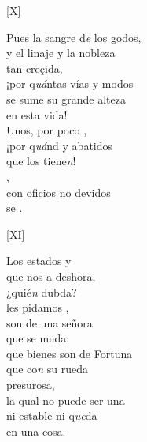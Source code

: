 \documentclass[11pt,a4paper,twoside]{article}
\begin{document}
{\begin{center}
	[X]
\end{center}
\pstart
Pues la sangre d\textit{e} los godos,\\
y el linaje y la nobleza\\
tan creçida,\\
¡por q\textit{uá}ntas vías y modos\\
se sume su grande alteza\\
en esta vida!\\
Unos, por poco ,\\
¡por q\textit{uá}nd  y abatidos\\
que los tiene\textit{n}!\\
,\\
con oficios no devidos\\
se .
\pend

\begin{center}
	[XI]
\end{center}
\pstart
Los estados y \\
que nos  a deshora,\\
¿quié\textit{n}  dubda?\\
 les pidamos ,\\
 son de una señora\\
que se muda:\\
que bienes son de Fortuna\\
que  co\textit{n} su rueda\\
presurosa,\\
la qual no puede ser una\\
ni  estable ni q\textit{ue}da\\
en una cosa.
\pend

}
\end{document}
